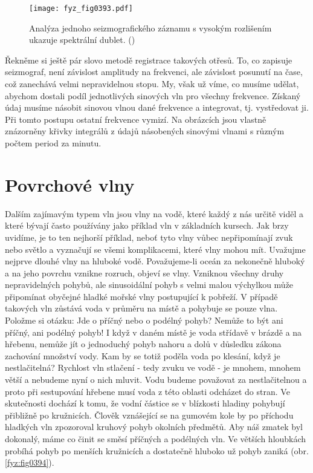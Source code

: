   \begin{figure}[ht!] %
    \centering
    \texttt{[image: fyz\_fig0393.pdf]}
    \caption{Analýza jednoho seizmografického záznamu s vysokým rozlišením ukazuje spektrální 
             dublet.
             (\cite[s.~694]{Feynman01})}
    \label{fyz:fig0393}
  \end{figure}
  
  Řekněme si ještě pár slovo metodě registrace takových otřesů. To, co zapisuje seizmograf, není 
  závislost amplitudy na frekvenci, ale závislost posunutí na čase, což zanechává velmi 
  nepravidelnou stopu. My, však už víme, co musíme udělat, abychom dostali podíl jednotlivých 
  sinových vln pro všechny frekvence. Získaný údaj musíme násobit sinovou vlnou dané frekvence a 
  integrovat, tj. vystředovat ji. Při tomto postupu ostatní frekvence vymizí. Na obrázcích jsou 
  vlastně znázorněny křivky integrálů z údajů násobených sinovými vlnami s různým počtem period za 
  minutu.
  
\section{Povrchové vlny}\label{fyz:IchapLIsecIV}
  Dalším zajímavým typem vln jsou vlny na vodě, které každý z nás určitě viděl a které bývají často 
  používány jako příklad vln v základních kursech. Jak brzy uvidíme, je to ten nejhorší příklad, 
  neboť tyto vlny vůbec nepřipomínají zvuk nebo světlo a vyznačují se všemi komplikacemi, které 
  vlny mohou mít. Uvažujme nejprve dlouhé vlny na hluboké vodě. Považujeme-li oceán za nekonečně 
  hluboký a na jeho povrchu vznikne rozruch, objeví se vlny. Vzniknou všechny druhy nepravidelných 
  pohybů, ale sinusoidální pohyb s velmi malou výchylkou může připomínat obyčejné hladké mořské 
  vlny postupující k pobřeží. V případě takových vln zůstává voda v průměru na místě a pohybuje se 
  pouze vlna. Položme si otázku: Jde o příčný nebo o podélný pohyb? Nemůže to být ani příčný, ani 
  podélný pohyb! I když v daném místě je voda střídavě v brázdě a na hřebenu, nemůže jít o 
  jednoduchý pohyb nahoru a dolů v důsledku zákona zachování množství vody. Kam by se totiž poděla 
  voda po klesání, když je nestlačitelná? Rychlost vln stlačení - tedy zvuku ve vodě - je mnohem, 
  mnohem větší a nebudeme nyní o nich mluvit. Vodu budeme považovat za nestlačitelnou a proto při 
  sestupování hřebene musí voda z této oblasti odcházet do stran. Ve skutečnosti dochází k tomu, že 
  vodní částice se v blízkosti hladiny pohybují přibližně po kružnicích. Člověk vznášející se 
  na gumovém kole by po příchodu hladkých vln zpozoroval kruhový pohyb okolních předmětů. Aby náš 
  zmatek byl dokonalý, máme co činit se směsí příčných a podélných vln. Ve větších hloubkách 
  probíhá pohyb po menších kružnicích a dostatečně hluboko už pohyb zaniká (obr. \ref{fyz:fig0394}).
  
